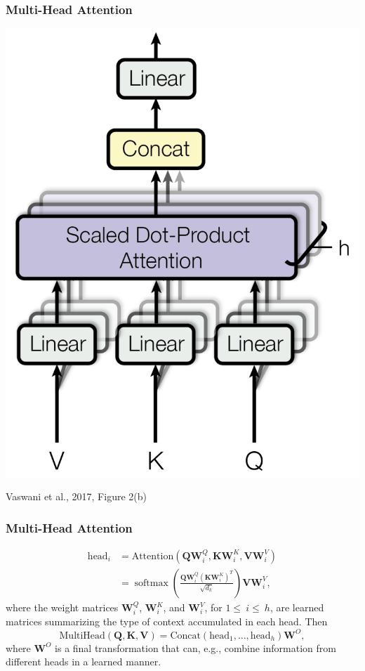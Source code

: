 \documentclass{beamer}
\DeclareMathOperator*{\softmax}{softmax}
\begin{document}
\begin{frame}
  \frametitle{Multi-Head Attention}

  \begin{center}
    \includegraphics[height=0.8\textheight]{figs/vaswani2017fig2b.png}

    \begin{tiny}
      Vaswani et al., 2017, Figure 2(b)
    \end{tiny}
  \end{center}
\end{frame}


\begin{frame}
  \frametitle{Multi-Head Attention}

  \begin{align*}
    \text{head}_i &=
    \text{Attention}\left(\bm{Q}\bm{W}_i^Q,\bm{K}\bm{W}_i^K,\bm{V}\bm{W}_i^V\right)\\
    &=
    \softmax\left(\frac{\bm{Q}\bm{W}_i^Q(\bm{K}\bm{W}_i^{K})^T}{\sqrt{d_k}}\right)\bm{V}\bm{W}_i^V,
  \end{align*}
  where the weight matrices $\bm{W}_i^Q$, $\bm{W}_i^K$, and
  $\bm{W}_i^V$, for $1\le~i\le~h$, are learned matrices summarizing
  the type of context accumulated in each head.  Then
  \begin{displaymath}
    \text{MultiHead}(\bm{Q},\bm{K},\bm{V}) = \text{Concat}(\text{head}_1,\ldots,\text{head}_h)\bm{W}^O,
  \end{displaymath}
  where $\bm{W}^O$ is a final transformation that can, e.g., combine
  information from different heads in a learned manner.
\end{frame}
\end{document}
